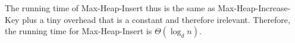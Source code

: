 \documentclass{article}
\begin{document}
\begin{center}
	\begin{minipage}{12cm}
		\begin{algorithmic}
			\EndIf{}


			\EndProcedure{}
		\end{algorithmic}
	\end{minipage}
\end{center}

The running time of Max-Heap-Insert thus is the same as Max-Heap-Increase-Key plus a tiny overhead that is a constant and therefore irelevant.
Therefore, the running time for Max-Heap-Insert is $\Theta(\log_d{n})$.
\end{document}
